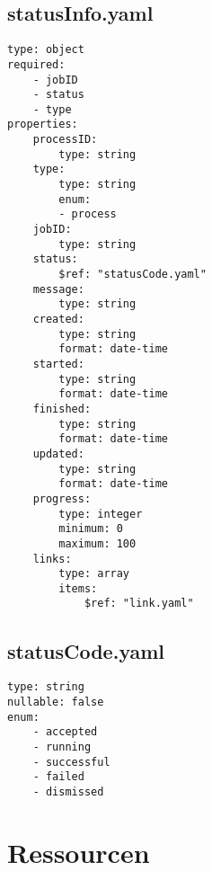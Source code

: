 \subsection{statusInfo.yaml}
\begin{lstlisting}[caption={statusInfo.yaml}, style = JSON]
type: object
required:
    - jobID
    - status
    - type
properties:
    processID:
        type: string
    type:
        type: string
        enum:
        - process
    jobID:
        type: string
    status:
        $ref: "statusCode.yaml"
    message:
        type: string
    created:
        type: string
        format: date-time
    started:
        type: string
        format: date-time
    finished:
        type: string
        format: date-time
    updated:
        type: string
        format: date-time
    progress:
        type: integer
        minimum: 0
        maximum: 100
    links:
        type: array
        items:
            $ref: "link.yaml"
\end{lstlisting}\label{appendixstatusInfoyaml}

\subsection{statusCode.yaml}
\begin{lstlisting}[caption={statusCode.yaml}, style = JSON]
type: string
nullable: false
enum:
    - accepted
    - running
    - successful
    - failed
    - dismissed
\end{lstlisting}\label{appendixstatusCodeyaml}

\section{Ressourcen}
\renewcommand{\lstlistingname}{Ressource}
